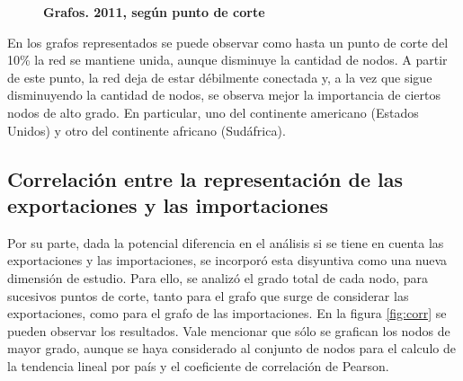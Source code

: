 \documentclass[a4paper]{article}
\begin{document}
\begin{figure}
\caption{\textbf{Grafos. 2011, según punto de corte}}
\label{fig:grafo_2011}
\end{figure}


En los grafos representados se puede observar como hasta un punto de corte del 10\% la red se mantiene unida, aunque disminuye la cantidad de nodos. A partir de este punto, la red deja de estar débilmente conectada y, a la vez que sigue disminuyendo la cantidad de nodos, se observa mejor la importancia de ciertos nodos de alto grado. En particular, uno del continente americano (Estados Unidos) y otro del continente africano (Sudáfrica).


\subsection{Correlación entre la representación de las exportaciones y las importaciones}

Por su parte, dada la potencial diferencia en el análisis si se tiene en cuenta las exportaciones y las importaciones, se incorporó esta disyuntiva como una nueva dimensión de estudio. Para ello, se analizó el grado total de cada nodo, para sucesivos puntos de corte, tanto para el grafo que surge de considerar las exportaciones, como para el grafo de las importaciones. En la figura \ref{fig:corr} se pueden observar los resultados. Vale mencionar que sólo se grafican los nodos de mayor grado, aunque se haya considerado al conjunto de nodos para el calculo de la tendencia lineal por país y el coeficiente de correlación de Pearson.
\end{document}
